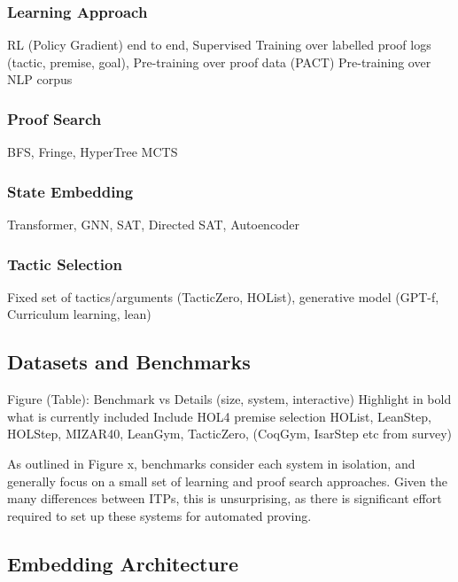 \documentclass[letterpaper]{article} %
\begin{document}
\subsubsection{Learning Approach}
RL (Policy Gradient) end to end,
Supervised Training over labelled proof logs (tactic, premise, goal),
Pre-training over proof data (PACT)
Pre-training over NLP corpus
\subsubsection{Proof Search}
BFS, Fringe, HyperTree MCTS
\subsubsection{State Embedding}
Transformer, GNN, SAT, Directed SAT, Autoencoder
\subsubsection{Tactic Selection}
Fixed set of tactics/arguments (TacticZero, HOList), generative model (GPT-f, Curriculum learning, lean)

%
\subsection{Datasets and Benchmarks}

Figure (Table):
Benchmark vs Details (size, system, interactive)
Highlight in bold what is currently included
Include HOL4 premise selection
HOList, LeanStep, HOLStep, MIZAR40, LeanGym, TacticZero, (CoqGym, IsarStep etc from survey)

As outlined in Figure x, benchmarks consider each system in isolation, and generally focus on a small set of
learning and proof search approaches.
Given the many differences between ITPs, this is unsurprising, as there is significant effort required to set
up these systems for automated proving.

%
%

\subsection{Embedding Architecture}
\end{document}
